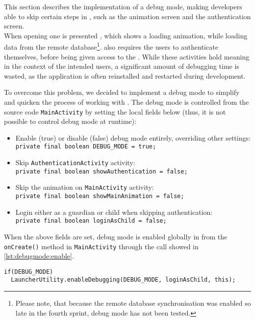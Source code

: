 This section describes the implementation of a debug mode, making developers able to skip certain steps in \launcher, such as the animation screen and the authentication screen.\\

When opening \launcher one is presented \mainactivity, which shows a loading animation, while loading data from the remote database\footnote{Please note, that because the remote database synchronisation was enabled so late in the fourth sprint, debug mode has not been tested.}.
\launcher also requires the users to authenticate themselves, before being given access to the \homeactivity.
While these activities hold meaning in the context of the intended users, a significant amount of debugging time is wasted, as the application is often reinstalled and restarted during development. 

To overcome this problem, we decided to implement a debug mode to simplify and quicken the process of working with \launcher.
The debug mode is controlled from the source code \lstinline|MainActivity| by setting the local fields below (thus, it is not possible to control debug mode at runtime):

\begin{itemize}
\item Enable (true) or disable (false) debug mode entirely, overriding other settings:\\
\lstinline|private final boolean DEBUG_MODE = true;|
\item Skip \lstinline|AuthenticationActivity| activity:\\
\lstinline|private final boolean showAuthentication = false;|
\item Skip the animation on \lstinline|MainActivity| activity:\\
\lstinline|private final boolean showMainAnimation = false;|
\item Login either as a guardian or child when skipping authentication:\\
\lstinline|private final boolean loginAsChild = false;|
\end{itemize}

When the above fields are set, debug mode is enabled globally in \launcher from the \lstinline|onCreate()| method in \lstinline|MainActivity| through the call showed in \cref{lst:debugmode:enable}.

\begin{lstlisting}[caption={Enable debug mode from \lstinline|MainActivity|.},label={lst:debugmode:enable}]  
if(DEBUG_MODE)
  LauncherUtility.enableDebugging(DEBUG_MODE, loginAsChild, this);
\end{lstlisting}

